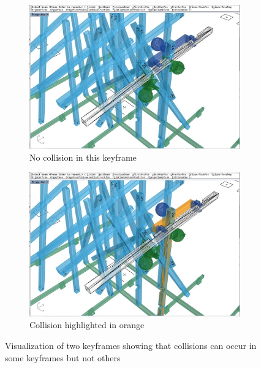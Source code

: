 \begin{figure}[!h]
    \centering
    \begin{subfigure}[b]{0.49\textwidth}
        \centering
        \includegraphics[width=\textwidth]{images/6a/img54.jpg}
        \caption{No collision in this keyframe}
        \label{fig:keyframe-no-collision}
    \end{subfigure}
    \hfill
    \begin{subfigure}[b]{0.49\textwidth}
        \centering
        \includegraphics[width=\textwidth]{images/6a/img55.jpg}
        \caption{Collision highlighted in orange}
        \label{fig:keyframe-has-collision}
    \end{subfigure}
    \caption{Visualization of two keyframes showing that collisions can occur in some keyframes but not others}
    \label{fig:collision-in-keyframes}
\end{figure}


